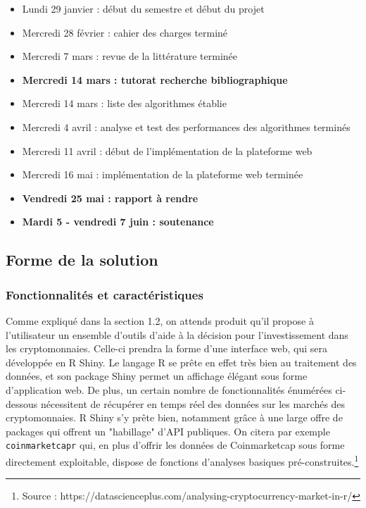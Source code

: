 \documentclass[a4paper]{article}
\begin{document}
\begin{itemize}
    \item Lundi 29 janvier : début du semestre et début du projet
    \item Mercredi 28 février : cahier des charges terminé
    \item Mercredi 7 mars : revue de la littérature terminée
    \item \textbf{Mercredi 14 mars : tutorat recherche bibliographique}
    \item Mercredi 14 mars : liste des algorithmes établie
    \item Mercredi 4 avril : analyse et test des performances des algorithmes terminés
    \item Mercredi 11 avril : début de l'implémentation de la plateforme web
    \item Mercredi 16 mai : implémentation de la plateforme web terminée
    \item \textbf{Vendredi 25 mai : rapport à rendre}
    \item \textbf{Mardi 5 - vendredi 7 juin : soutenance}
\end{itemize}

\subsection{Forme de la solution}

\subsubsection{Fonctionnalités et caractéristiques}

Comme expliqué dans la section 1.2, on attends produit qu'il propose à l'utilisateur un ensemble d'outils d'aide à la décision pour l'investissement dans les cryptomonnaies. Celle-ci prendra la forme d'une interface web, qui sera développée en R Shiny. Le langage R se prête en effet très bien au traitement des données, et son package Shiny permet un affichage élégant sous forme d'application web. De plus, un certain nombre de fonctionnalités énumérées ci-dessous nécessitent de récupérer en temps réel des données sur les marchés des cryptomonnaies. R Shiny s'y prête bien, notamment grâce à une large offre de packages qui offrent un "habillage" d'API publiques. On citera par exemple \texttt{coinmarketcapr} qui, en plus d'offrir les données de Coinmarketcap sous forme directement exploitable, dispose de fonctions d'analyses basiques pré-construites.\footnote{Source : https://datascienceplus.com/analysing-cryptocurrency-market-in-r/} 
\end{document}
